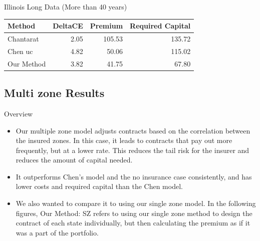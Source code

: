 \documentclass{beamer}
\begin{document}
\begin{frame}{Illinois Long Data (More than 40 years)}
    \begin{table}
        \centering
        \begin{tabular}{lrrr}
            \toprule
            Method & DeltaCE & Premium & Required Capital \\
            \midrule
            Chantarat & 2.05 & 105.53 & 135.72 \\
            Chen uc & 4.82 & 50.06 & 115.02 \\
            Our Method & 3.82 & 41.75 & 67.80 \\
            \bottomrule
            \end{tabular}
    \end{table}
    
\end{frame}








\subsection{Multi zone Results}
\begin{frame}{Overview}
    \begin{itemize}
        \item Our multiple zone model adjusts contracts based on the correlation between the insured zones. In this case, it leads to contracts that pay out more frequently, but at a lower rate. This reduces the tail risk for the insurer and reduces the amount of capital needed. 
        \item It outperforms Chen's model and the no insurance case consistently, and has lower costs and required capital than the Chen model. 
        \item We also wanted to compare it to using our single zone model. In the following figures, Our Method: SZ refers to using our single zone method to design the contract of each state individually, but then calculating the premium as if it was a part of the portfolio. 
    \end{itemize}
\end{frame}
\end{document}
